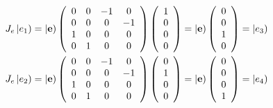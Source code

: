 \documentclass[aps,preprint]{revtex4}%
\begin{document}
\begin{align}
J_{e}\left\vert e_{1}\right)   &  =\left\vert \mathbf{e}\right)  \left(
\begin{array}
[c]{cccc}%
0 & 0 & -1 & 0\\
0 & 0 & 0 & -1\\
1 & 0 & 0 & 0\\
0 & 1 & 0 & 0
\end{array}
\right)  \left(
\begin{array}
[c]{c}%
1\\
0\\
0\\
0
\end{array}
\right)  =\left\vert \mathbf{e}\right)  \left(
\begin{array}
[c]{c}%
0\\
0\\
1\\
0
\end{array}
\right)  =\left\vert e_{3}\right) \\
J_{e}\left\vert e_{2}\right)   &  =\left\vert \mathbf{e}\right)  \left(
\begin{array}
[c]{cccc}%
0 & 0 & -1 & 0\\
0 & 0 & 0 & -1\\
1 & 0 & 0 & 0\\
0 & 1 & 0 & 0
\end{array}
\right)  \left(
\begin{array}
[c]{c}%
0\\
1\\
0\\
0
\end{array}
\right)  =\left\vert \mathbf{e}\right)  \left(
\begin{array}
[c]{c}%
0\\
0\\
0\\
1
\end{array}
\right)  =\left\vert e_{4}\right)
\end{align}
%
\end{document}
